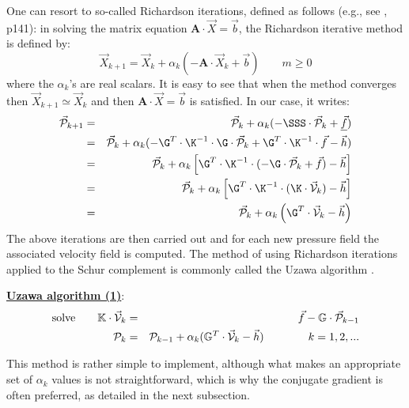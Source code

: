 One can resort to so-called Richardson iterations, defined as follows (e.g., see \cite{varga}, p141):
in solving the matrix equation ${\bm A}\cdot {\vec X}={\vec b}$,
the Richardson iterative method is defined by: 
\begin{equation}
{\vec X}_{k+1} = {\vec X}_k + \alpha_k (-{\bm A} \cdot {\vec X}_k + {\vec b})
\quad\quad
m\geq 0 
\end{equation}
where the $\alpha_k$'s are real scalars. 
It is easy to see that when the method converges then ${\vec X}_{k+1} \simeq {\vec X}_k$  and then 
${\bm A}\cdot {\vec X}={\vec b}$ is satisfied. 
In our case, it writes:
\begin{eqnarray}
\vec {\cal P}_{k+1} 
&=& \vec {\cal P}_k + \alpha_k ( - \SSS \cdot \vec{\cal P}_k  +  \underline{\vec{f}}) \nonumber\\
&=& \vec {\cal P}_k + \alpha_k ( - \G^T \cdot \K^{-1} \cdot \G \cdot \vec{\cal P}_k  
+  \G^T \cdot \K^{-1} \cdot \vec{f} - \vec{h}   ) \nonumber\\
&=& \vec {\cal P}_k + \alpha_k \left[ \G^T \cdot \K^{-1} \cdot ( - \G \cdot \vec{\cal P}_k + \vec{f}) - \vec{h} \right] \nonumber\\
&=& \vec {\cal P}_k + \alpha_k \left[ \G^T \cdot \K^{-1} \cdot ( \K\cdot \vec{\cal V}_k)  - \vec{h} \right] \nonumber\\
&=& \vec {\cal P}_k + \alpha_k \left( \G^T \cdot \vec{\cal V}_k  - \vec{h} \right) 
\end{eqnarray}
The above iterations are then carried out and for each new pressure field the associated velocity field 
is computed. The method of using Richardson iterations applied to the Schur complement 
is commonly called the Uzawa algorithm \cite[p221]{braess}.

\begin{mdframed}[backgroundcolor=blue!5]
\underline{\bf Uzawa algorithm (1)}:
\begin{eqnarray}
\text{solve} \qquad \mathbb{K} \cdot \vec{\cal V}_k &=& \vec f - \mathbb{G}\cdot \vec {\cal P}_{k-1} \\
{\cal P}_k &=& {\cal P}_{k-1}  + \alpha_k (\mathbb{G}^T\cdot \vec{\cal V}_k -\vec h)
\quad
\quad
\quad
\quad
k=1,2, ... \label{uzaa2}
\end{eqnarray}
\end{mdframed}


This method is rather simple to implement, although
what makes an appropriate set of $\alpha_k$ values is not straightforward, which is why 
the conjugate gradient is often preferred, as detailed in the next subsection. 

